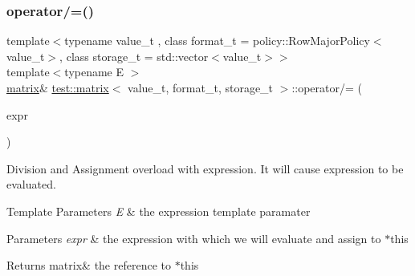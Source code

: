 \subsubsection{\texorpdfstring{operator/=()}{operator/=()}}
{\footnotesize\ttfamily template$<$typename value\+\_\+t , class format\+\_\+t  = policy\+::\+Row\+Major\+Policy$<$value\+\_\+t$>$, class storage\+\_\+t  = std\+::vector$<$value\+\_\+t$>$$>$ \\
template$<$typename E $>$ \\
\mbox{\hyperlink{classtest_1_1matrix}{matrix}}\& \mbox{\hyperlink{classtest_1_1matrix}{test\+::matrix}}$<$ value\+\_\+t, format\+\_\+t, storage\+\_\+t $>$\+::operator/= (\begin{DoxyParamCaption}\item[{\mbox{\hyperlink{classtest_1_1expression}{expression}}$<$ E $>$ const \&}]{expr }\end{DoxyParamCaption})\hspace{0.3cm}{\ttfamily [inline]}}



Division and Assignment overload with expression. It will cause expression to be evaluated. 


\begin{DoxyTemplParams}{Template Parameters}
{\em E} & the expression template paramater \\
\hline
\end{DoxyTemplParams}

\begin{DoxyParams}{Parameters}
{\em expr} & the expression with which we will evaluate and assign to $\ast$this \\
\hline
\end{DoxyParams}
\begin{DoxyReturn}{Returns}
matrix\& the reference to $\ast$this 
\end{DoxyReturn}
\mbox{\label{classtest_1_1matrix_a2451869ee60cb1642d730aeacbef0e06}} 
